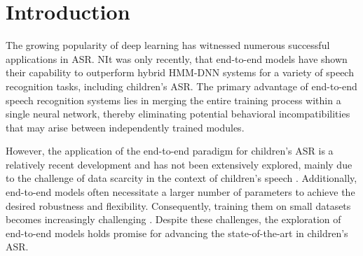 \label{chap:4}
\cleardoublepage
\section{Introduction}
\label{chap:implement}
The growing popularity of deep learning has witnessed numerous successful applications in ASR. NIt was only recently, that end-to-end models have shown their capability to outperform hybrid HMM-DNN systems for a variety of speech recognition tasks, including children's ASR. The primary advantage of end-to-end speech recognition systems lies in merging the entire training process within a single neural network, thereby eliminating potential behavioral incompatibilities that may arise between independently trained modules.

However, the application of the end-to-end paradigm for children's ASR is a relatively recent development and has not been extensively explored, mainly due to the challenge of data scarcity in the context of children's speech \cite{gelin2021endtoend,sri_end2end,chen2020data,ng2020cuhk}. Additionally, end-to-end models often necessitate a larger number of parameters to achieve the desired robustness and flexibility. Consequently, training them on small datasets becomes increasingly challenging \cite{luscher2019rwth}. Despite these challenges, the exploration of end-to-end models holds promise for advancing the state-of-the-art in children's ASR.


